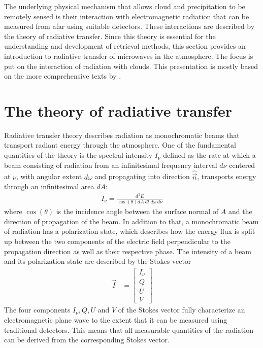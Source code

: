 The underlying physical mechanism that allows cloud and precipitation to be
remotely sensed is their interaction with electromagnetic radiation that can be
measured from afar using suitable detectors. These interactions are described by
the theory of radiative transfer. Since this theory is essential for the
understanding and development of retrieval methods, this section provides an
introduction to radiative transfer of microwaves in the atmosphere.
The focus is put on the interaction of radiation with clouds. This
presentation is mostly based on the more comprehensive texts by
\textcite{thomas02, mischenko02, wallace06}.

\section{The theory of radiative transfer}

Radiative transfer theory describes radiation as monochromatic beams that
transport radiant energy through the atmosphere. One of the fundamental
quantities of the theory is the spectral intensity $I_\nu$ defined as the rate
at which a beam consisting of radiation from an infinitesimal frequency interval
$d\nu$ centered at $\nu$, with angular extent $d\omega$ and propagating into
direction $\hat{\vec{n}}$, transports energy through an infinitesimal area $dA$:
\begin{align}\label{eq:spectral_intensity}
  I_\nu = \frac{d^5E}{\cos(\theta) dA\ dt\ d\omega\ d\nu}
\end{align}
where $\cos(\theta)$ is the incidence angle between the surface normal of $A$
and the direction of propagation of the beam. In addition to that, a
monochromatic beam of radiation has a polarization state, which describes how
the energy flux is split up between the two components of the electric field
perpendicular to the propagation direction as well as their respective phase.
The intensity of a beam and its polarization state are described by the Stokes
vector
\begin{align}
  \vec{I} &= \left [ \begin{array}{c}I_\nu \\ Q \\ U \\ V\end{array} \right ]
\end{align}
The four components $I_\nu, Q, U$ and $V$ of the Stokes vector fully characterize an
electromagnetic plane wave to the extent that it can be measured using
traditional detectors. This means that all  measurable quantities of the
radiation can be derived from the corresponding Stokes vector.

